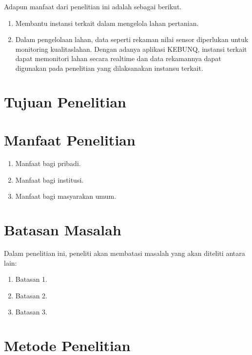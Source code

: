 \begin{flushleft}
\begin{justify}
  Adapun manfaat dari penelitian ini adalah sebagai berikut.


\end{justify}
\begin{enumerate}
  \item Membantu instansi terkait dalam mengelola lahan pertanian.
  \item Dalam pengelolaan lahan, data seperti rekaman nilai sensor diperlukan untuk monitoring kualitaslahan. Dengan adanya aplikasi KEBUNQ, instansi terkait dapat memonitori lahan secara realtime dan data rekamannya dapat digunakan pada penelitian yang dilaksanakan instansu terkait.

  \end{enumerate}
\vspace{2cm}

\end{flushleft}








\section{Tujuan Penelitian}

\section{Manfaat Penelitian}
\begin{enumerate}[nolistsep,leftmargin=0.5cm]
\item Manfaat bagi pribadi.
\item Manfaat bagi institusi.
\item Manfaat bagi masyarakan umum.
\end{enumerate}

\section{Batasan Masalah}
Dalam penelitian ini, peneliti akan membatasi masalah yang akan diteliti antara lain:
\begin{enumerate}[nolistsep,leftmargin=0.5cm]
\item Batasan 1.
\item Batasan 2.
\item Batasan 3.
\end{enumerate}


\section{Metode Penelitian}

